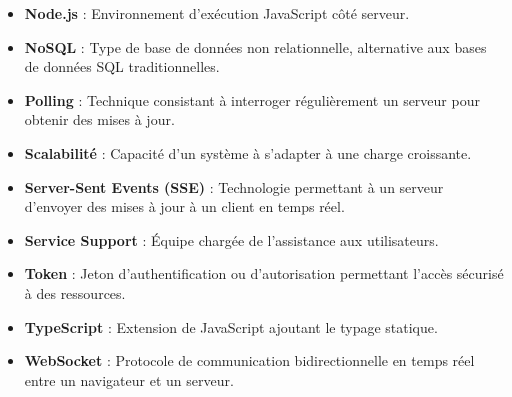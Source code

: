 \begin{itemize}
\item {\bf Node.js} : Environnement d'exécution JavaScript côté serveur.
\item {\bf NoSQL} : Type de base de données non relationnelle, alternative aux bases de données SQL traditionnelles.
\item {\bf Polling} : Technique consistant à interroger régulièrement un serveur pour obtenir des mises à jour.
\item {\bf Scalabilité} : Capacité d'un système à s'adapter à une charge croissante.
\item {\bf Server-Sent Events (SSE)} : Technologie permettant à un serveur d'envoyer des mises à jour à un client en temps réel.
\item {\bf Service Support} : Équipe chargée de l'assistance aux utilisateurs.
\item {\bf Token} : Jeton d'authentification ou d'autorisation permettant l'accès sécurisé à des ressources.
\item {\bf TypeScript} : Extension de JavaScript ajoutant le typage statique.
\item {\bf WebSocket} : Protocole de communication bidirectionnelle en temps réel entre un navigateur et un serveur.
\end{itemize}
